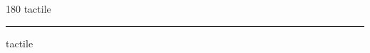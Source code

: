 
\begin{frame}
\begin{center}
\begin{turn}{180}
{\fontsize{2.5cm}{1em}\selectfont tactile}
\end{turn}
\vspace{1em}\par  
\hrule
\vspace{1em}\par  
{\fontsize{2.5cm}{1em}\selectfont tactile}
\end{center}
\end{frame}
